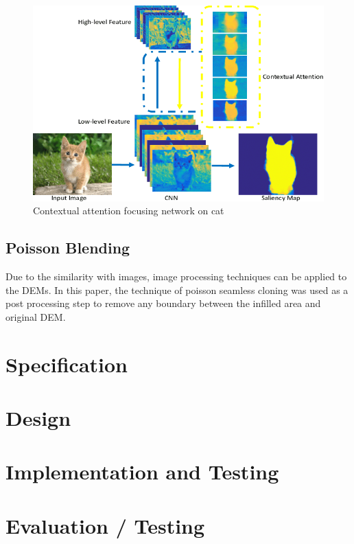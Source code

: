 \documentclass[twocolumn]{article}
\begin{document}
\begin{figure}[htbp]
\centering
\includegraphics[width=.9\linewidth]{images/contextual_attention.png}
\caption{\label{fig:contextual_attention}Contextual attention focusing network on cat \autocite{zhangAgileAmuletRealTime2018}}
\end{figure}

\subsection{Poisson Blending}
\label{sec:org131e5a8}
Due to the similarity with images, image processing techniques can be applied to the DEMs.
In this paper, the technique of poisson seamless cloning\autocite{perezPoissonImageEditing2003} was used as a post processing step to remove any boundary between the infilled area and original DEM.

\section{Specification}
\label{sec:org20a89cb}

\section{Design}
\label{sec:org751c7d0}

\section{Implementation and Testing}
\label{sec:org907615b}

\section{Evaluation / Testing}
\label{sec:org1a8b520}
\end{document}

